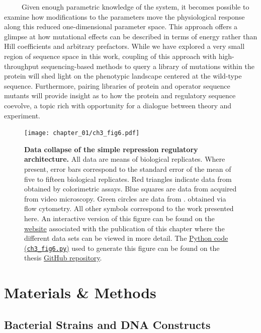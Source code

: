 \documentclass[12pt]{caltech_thesis}
\begin{document}
~~~~~Given enough parametric knowledge of the system, it becomes
possible to examine how modifications to the parameters move the
physiological response along this reduced one-dimensional parameter
space. This approach offers a glimpse at how mutational effects can be
described in terms of energy rather than Hill coefficients and arbitrary
prefactors. While we have explored a very small region of sequence space
in this work, coupling of this approach with high-throughput
sequencing-based methods to query a library of mutations within the
protein will shed light on the phenotypic landscape centered at the
wild-type sequence. Furthermore, pairing libraries of protein and
operator sequence mutants will provide insight as to how the protein and
regulatory sequence coevolve, a topic rich with opportunity for a
dialogue between theory and experiment.

\hypertarget{fig:all_data_collapse}{%
\begin{figure}
\centering
\texttt{[image: chapter\_01/ch3\_fig6.pdf]}
\caption[{Data collapse of the simple repression regulatory
architecture. All data are means of biological
replicates.}]{\textbf{Data collapse of the simple repression regulatory
architecture.} All data are means of biological replicates. Where
present, error bars correspond to the standard error of the mean of five
to fifteen biological replicates. Red triangles indicate data from
\textcite{garcia2011} obtained by colorimetric assays. Blue squares are
data from \textcite{brewster2014} acquired from video microscopy. Green
circles are data from \textcite{razo-mejia2018}. obtained via flow
cytometry. All other symbols correspond to the work presented here. An
interactive version of this figure can be found on the
\href{https://www.rpgroup.caltech.edu/mwc_mutants}{website} associated
with the publication of this chapter where the different data sets can
be viewed in more detail. The
\href{https://github.com/gchure/phd/blob/master/src/chapter_03/code/ch3_fig6.py}{Python
code (\texttt{ch3\_fig6.py})} used to generate this figure can be found
on the thesis \href{https://github.com/gchure/phd}{GitHub repository}.}
\label{fig:all_data_collapse}
\end{figure}
}

\hypertarget{materials-methods-1}{%
\section{Materials \& Methods}\label{materials-methods-1}}

\hypertarget{bacterial-strains-and-dna-constructs-1}{%
\subsection{Bacterial Strains and DNA
Constructs}\label{bacterial-strains-and-dna-constructs-1}}
\end{document}
